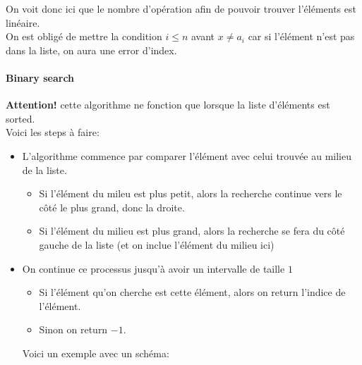 \begin{framedremark}
    On voit donc ici que le nombre d'opération afin de pouvoir trouver l'éléments est linéaire.
    \\
    On est obligé de mettre la condition $i \leq n$ avant $x \neq a_i$ car si l'élément n'est pas dans la liste, on aura une error d'index.
\end{framedremark}

\paragraph{Binary search}
\textbf{Attention!} cette algorithme ne fonction que lorsque la liste d'éléments est sorted.
\\
Voici les steps à faire:
\begin{itemize}
    \item L'algorithme commence par comparer l'élément avec celui trouvée au milieu de la liste.
    \begin{itemize}
        \item Si l'élément du mileu est plus petit, alors la recherche continue vers le côté le plus grand, donc la droite.
        \item Si l'élément du milieu est plus grand, alors la recherche se fera du côté gauche de la liste (et on inclue l'élément du milieu ici)
    \end{itemize}
    \item On continue ce processus jusqu'à avoir un intervalle de taille $1$
    \begin{itemize}
        \item Si l'élément qu'on cherche est cette élément, alors on return l'indice de l'élément.
        \item Sinon on return $-1$.
    \end{itemize}
    \begin{exemple}
        Voici un exemple avec un schéma:
        \begin{center}
    

\end{center}
\end{exemple}
\end{itemize}
